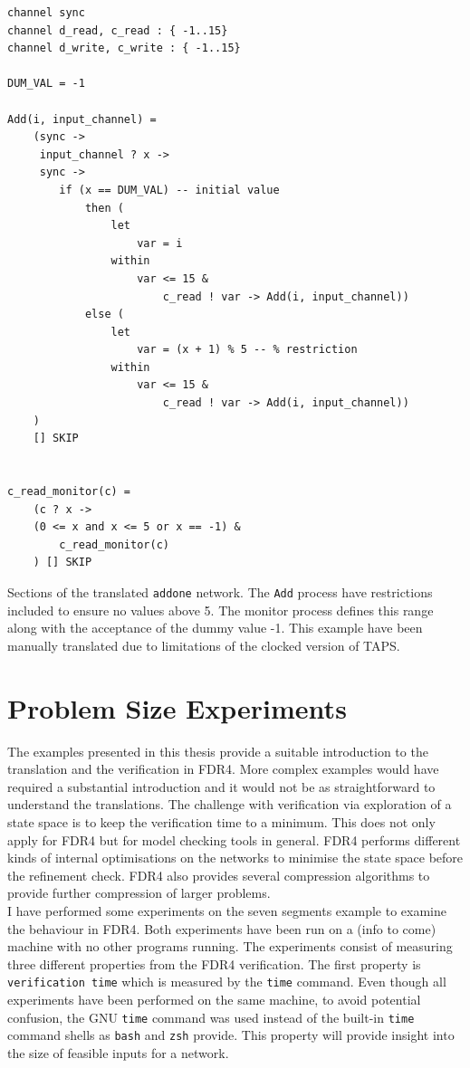 \begin{listing}
\begin{verbatim}
channel sync
channel d_read, c_read : { -1..15}
channel d_write, c_write : { -1..15}

DUM_VAL = -1

Add(i, input_channel) =
    (sync ->
     input_channel ? x ->
     sync ->
        if (x == DUM_VAL) -- initial value
            then (
                let
                    var = i
                within
                    var <= 15 &
                        c_read ! var -> Add(i, input_channel))
            else (
                let
                    var = (x + 1) % 5 -- % restriction
                within
                    var <= 15 &
                        c_read ! var -> Add(i, input_channel))
    )
    [] SKIP


c_read_monitor(c) =
    (c ? x ->
    (0 <= x and x <= 5 or x == -1) &
        c_read_monitor(c)
    ) [] SKIP

\end{verbatim}
\caption{Sections of the translated \texttt{addone} network. The \texttt{Add} process have restrictions included to ensure no values above 5. The monitor process defines this range along with the acceptance of the dummy value -1. This example have been manually translated due to limitations of the clocked version of TAPS.}
\label{lst:cspm_addone_restricted}
\end{listing}
\section{Problem Size Experiments}
The examples presented in this thesis provide a suitable introduction to the translation and the verification in FDR4. More complex examples would have required a substantial introduction and it would not be as straightforward to understand the translations. The challenge with verification via exploration of a state space is to keep the verification time to a minimum. This does not only apply for FDR4 but for model checking tools in general. FDR4 performs different kinds of internal optimisations on the networks to minimise the state space before the refinement check. FDR4 also provides several compression algorithms to provide further compression of larger problems. \\

I have performed some experiments on the seven segments example to examine the behaviour in FDR4.
Both experiments have been run on a (info to come) %
machine with no other programs running. The experiments consist of measuring three different properties from the FDR4 verification. The first property is \texttt{verification time} which is measured by the \texttt{time} command. Even though all experiments have been performed on the same machine, to avoid potential confusion, the GNU \texttt{time} command was used instead of the built-in \texttt{time} command shells as \texttt{bash} and \texttt{zsh} provide. This property will provide insight into the size of feasible inputs for a \cspm{} network.\\

